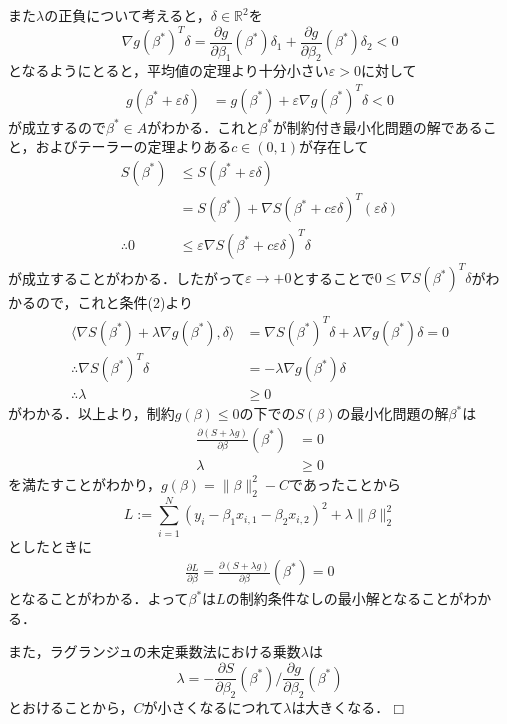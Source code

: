 \documentclass{jsarticle}
\theoremstyle{definition}
\theoremstyle{mystyle} %
\def\qed{\hfill$\Box$}
\begin{document}
\begin{description}
また$\lambda$の正負について考えると，$\delta\in \mathbb{R}^2$を
$$\nabla g(\beta^{\ast})^T \delta=\frac{\partial g}{\partial \beta_1}(\beta^{\ast})\delta_1+\frac{\partial g}{\partial \beta_2}(\beta^{\ast})\delta_2<0$$
となるようにとると，平均値の定理より十分小さい$\varepsilon>0$に対して
\begin{align*}
g(\beta^{\ast}+\varepsilon \delta)&=g(\beta^{\ast})+\varepsilon\nabla g(\beta^{\ast})^T \delta<0
\end{align*}
が成立するので$\beta^{\ast}\in A$がわかる．これと$\beta^{\ast}$が制約付き最小化問題の解であること，およびテーラーの定理よりある$c\in(0,1)$が存在して
\begin{align*}
S(\beta^{\ast})&\leq S(\beta^{\ast}+\varepsilon \delta)\\
&=S(\beta^{\ast})+\nabla S(\beta^{\ast}+c\varepsilon \delta)^T(\varepsilon \delta)\\
\therefore 0&\leq \varepsilon \nabla S(\beta^{\ast}+c\varepsilon \delta)^T\delta	
\end{align*}
が成立することがわかる．したがって$\varepsilon\to +0$とすることで$0\leq \nabla S(\beta^{\ast})^T\delta$がわかるので，これと条件(2)より
\begin{align*}
\langle \nabla S(\beta^{\ast})+\lambda \nabla g(\beta^{\ast}),\delta\rangle &= \nabla S(\beta^{\ast})^T\delta+\lambda \nabla g(\beta^{\ast})\delta=0\\
\therefore \nabla S(\beta^{\ast})^T\delta&=-\lambda \nabla g(\beta^{\ast})\delta\\
\therefore \lambda&\geq 0
\end{align*}
がわかる．以上より，制約$g(\beta)\leq 0$の下での$S(\beta)$の最小化問題の解$\beta^{\ast}$は
\begin{align*}
\frac{\partial (S+\lambda g)}{\partial \beta}(\beta^{\ast})&=0\\
\lambda&\geq 0
\end{align*}
を満たすことがわかり，$g(\beta)=\|\beta\|_2^2-C$であったことから
$$L:=\sum_{i=1}^N(y_i-\beta_1x_{i,1}-\beta_2 x_{i,2})^2+\lambda\|\beta\|_2^2$$
としたときに
\begin{align*}
\frac{\partial L}{\partial \beta}=\frac{\partial (S+\lambda g)}{\partial \beta}(\beta^{\ast})=0
\end{align*}
となることがわかる．よって$\beta^{\ast}$は$L$の制約条件なしの最小解となることがわかる．\\
\end{description}
また，ラグランジュの未定乗数法における乗数$\lambda$は
$$\lambda=-\frac{\partial S}{\partial \beta_2}(\beta^{\ast})/\frac{\partial g}{\partial  \beta_2}(\beta^{\ast})$$
とおけることから，$C$が小さくなるにつれて$\lambda$は大きくなる．\qed\\
\end{document}
